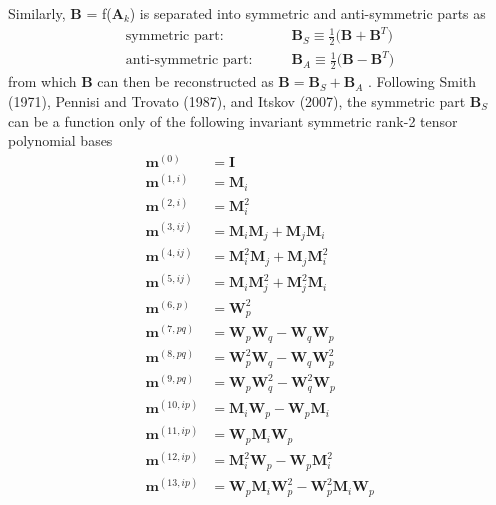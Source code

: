 Similarly, $\mathbf{B}$ = f($\mathbf{A}_{k}$)  is separated into symmetric and anti-symmetric parts as
%
\begin{subequations}
\label{E:27}
\begin{align}
 	\text{symmetric part:} & \qquad
	\mathbf{B}_{S} \equiv \frac{1}{2} \big( \mathbf{B} + \mathbf{B}^T \big) \\
	\text{anti-symmetric part:} & \qquad
	\mathbf{B}_{A} \equiv \frac{1}{2} \big( \mathbf{B} - \mathbf{B}^T \big) 
\end{align}
\end{subequations}
%
%    
from which $\mathbf{B}$ can then be reconstructed as $ \mathbf{B}= \mathbf{B}_S + \mathbf{B}_A$ . Following Smith (1971), Pennisi and Trovato (1987), and Itskov (2007), the symmetric part  $\mathbf{B}_S$ can be a function only of the following invariant symmetric rank-2 tensor polynomial bases
%
\begin{subequations}
\label{E:28}
\begin{align}
 	\mathbf{m}^{(0)} &= \mathbf{I}  \\
	\mathbf{m}^{(1,i)} &= \mathbf{M}_i \\ 
	\mathbf{m}^{(2,i)} &= \mathbf{M}^2_i \\ 
	\mathbf{m}^{(3,ij)} &= \mathbf{M}_i \mathbf{M}_j + \mathbf{M}_j \mathbf{M}_i \\ 
	\mathbf{m}^{(4,ij)} &= \mathbf{M}^2_i \mathbf{M}_j + \mathbf{M}_j \mathbf{M}^2_i \\
	\mathbf{m}^{(5,ij)} &= \mathbf{M}_i \mathbf{M}^2_j + \mathbf{M}^2_j \mathbf{M}_i \\
	\mathbf{m}^{(6,p)} &= \mathbf{W}^2_p \\ 
	\mathbf{m}^{(7,pq)} &= \mathbf{W}_p \mathbf{W}_q - \mathbf{W}_q \mathbf{W}_p \\ 
	\mathbf{m}^{(8,pq)} &= \mathbf{W}^2_p \mathbf{W}_q - \mathbf{W}_q \mathbf{W}^2_p \\
	\mathbf{m}^{(9,pq)} &= \mathbf{W}_p \mathbf{W}^2_q - \mathbf{W}^2_q \mathbf{W}_p \\
	\mathbf{m}^{(10,ip)} &= \mathbf{M}_i \mathbf{W}_p - \mathbf{W}_p \mathbf{M}_i   \\
	\mathbf{m}^{(11,ip)} &= \mathbf{W}_p \mathbf{M}_i \mathbf{W}_p   \\ 
	\mathbf{m}^{(12,ip)} &= \mathbf{M}^2_i \mathbf{W}_p-\mathbf{W}_p \mathbf{M}^2_i\\ 
	\mathbf{m}^{(13,ip)} &= \mathbf{W}_p \mathbf{M}_i \mathbf{W}^2_p
						   -\mathbf{W}^2_p \mathbf{M}_i \mathbf{W}_p
\end{align}
\end{subequations}
